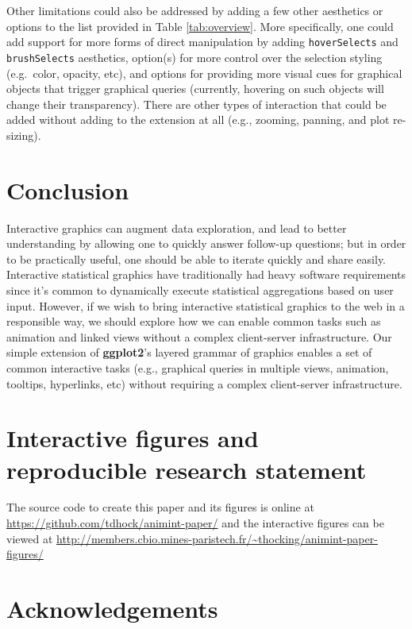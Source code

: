 \documentclass[12pt,]{article}
\theoremstyle{definition}
\theoremstyle{definition}
\theoremstyle{definition}
\theoremstyle{remark}
\begin{document}
Other limitations could also be addressed by adding a few other
aesthetics or options to the list provided in Table \ref{tab:overview}.
More specifically, one could add support for more forms of direct
manipulation by adding \texttt{hoverSelects} and \texttt{brushSelects}
aesthetics, option(s) for more control over the selection styling
(e.g.~color, opacity, etc), and options for providing more visual cues
for graphical objects that trigger graphical queries (currently,
hovering on such objects will change their transparency). There are
other types of interaction that could be added without adding to the
extension at all (e.g., zooming, panning, and plot re-sizing).

\hypertarget{conclusion}{%
\section{Conclusion}\label{conclusion}}

Interactive graphics can augment data exploration, and lead to better
understanding by allowing one to quickly answer follow-up questions; but
in order to be practically useful, one should be able to iterate quickly
and share easily. Interactive statistical graphics have traditionally
had heavy software requirements since it's common to dynamically execute
statistical aggregations based on user input. However, if we wish to
bring interactive statistical graphics to the web in a responsible way,
we should explore how we can enable common tasks such as animation and
linked views without a complex client-server infrastructure. Our simple
extension of \textbf{ggplot2}'s layered grammar of graphics enables a
set of common interactive tasks (e.g., graphical queries in multiple
views, animation, tooltips, hyperlinks, etc) without requiring a complex
client-server infrastructure.

\section*{Interactive figures and reproducible research statement}

The source code to create this paper and its figures is online at
\url{https://github.com/tdhock/animint-paper/} and the interactive
figures can be viewed at
\url{http://members.cbio.mines-paristech.fr/~thocking/animint-paper-figures/}

\section*{Acknowledgements}
\end{document}
